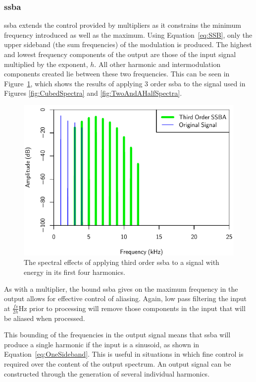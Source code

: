 		\subsubsection*{\acrshort{ssba}}
			\acrshort{ssba} extends the control provided by multipliers as it constrains the minimum frequency
			introduced as well as the maximum. Using Equation~\ref{eq:SSB}, only the upper sideband (the sum
			frequencies) of the modulation is produced. The highest and lowest frequency components of the
			output are those of the input signal multiplied by the exponent, $h$. All other harmonic and
			intermodulation components created lie between these two frequencies. This can be seen in
			Figure~\ref{fig:SSBA3Spectra}, which shows the results of applying $3$ order
			\acrshort{ssba} to the signal used in Figures \ref{fig:CubedSpectra} and
			\ref{fig:TwoAndAHalfSpectra}. 
			
			\begin{figure}[h!]
				\centering
				\includegraphics{chapter5/Images/SSBA3Spectra.pdf}
				\caption{The spectral effects of applying third order \acrshort{ssba} to a signal with
					 energy in its first four harmonics.}
				\label{fig:SSBA3Spectra}
			\end{figure}

			As with a multiplier, the bound \acrshort{ssba} gives on the maximum frequency in the output allows
			for effective control of aliasing. Again, low pass filtering the input at $\frac{fs}{2h}$Hz prior
			to processing will remove those components in the input that will be aliased when processed.

			This bounding of the frequencies in the output signal means that \acrshort{ssba} will produce a
			single harmonic if the input is a sinusoid, as shown in Equation~\ref{eq:OneSideband}. This is
			useful in situations in which fine control is required over the content of the output spectrum. An
			output signal can be constructed through the generation of several individual harmonics.

